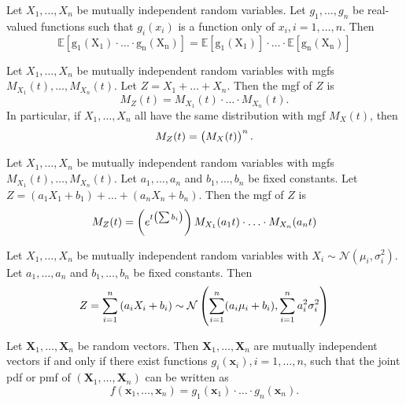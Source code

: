 \documentclass{article}
\theoremstyle{plain}
\newenvironment{theorem}[1]
      {\renewcommand\theinnertheorem{#1}\innertheorem}
      {\endinnertheorem}
\theoremstyle{definition}
\theoremstyle{plain}
\theoremstyle{plain}
\newenvironment{corollary}[1]
      {\renewcommand\theinnercorollary{#1}\innercorollary}
      {\endinnercorollary}
\renewcommand{\vec}[1]{\boldsymbol{#1}}
\newcommand{\E}[1]{\mathrm{\mathbb{E} \left[#1 \right]}}
\begin{document}
\begin{multicols}{2}
\begin{theorem}{4.6.6}[]
  Let $X_1, \ldots, X_n$ be mutually independent random variables.
  Let $g_1, \ldots, g_n$ be real-valued functions such that $g_i(x_i)$ is a function
  only of $x_i, i = 1, \ldots, n$.
  Then
  \begin{equation*}
    \E{g_1(X_1) \cdot \ldots \cdot g_n(X_n)}
    =
  \E{g_1(X_1)} \cdot \ldots \cdot \E{g_n(X_n)}
  \end{equation*}
\end{theorem}

\begin{theorem}{4.6.7}[]
  Let $X_1, \ldots, X_n$ be mutually independent random variables with mgfs
  $M_{X_1}(t), \ldots, M_{X_n}(t)$. Let $Z = X_1 + \ldots + X_n$.
  Then the mgf of $Z$ is
  \begin{equation*}
    M_Z(t) = M_{X_1}(t) \cdot \ldots \cdot M_{X_n}(t).
  \end{equation*}
  In particular, if $X_1, \ldots, X_n$ all have the same distribution with mgf
  $M_X(t)$, then
  \begin{equation*}
    M_Z(t) = \del{M_X(t)}^n.
  \end{equation*}
\end{theorem}

\begin{corollary}{4.6.9}[]
  Let $X_1, \ldots, X_n$ be mutually independent random variables with mgfs
  $M_{X_1}(t), \ldots, M_{X_n}(t)$. Let $a_1, \ldots, a_n$ and $b_1, \ldots, b_n$
  be fixed constants. Let $Z = (a_1 X_1 + b_1) + \ldots + (a_n X_n + b_n)$.
  Then the mgf of $Z$ is
  \begin{equation*}
    M_Z(t) = \del{e^{t\del{\sum b_i}}} M_{X_1}(a_1 t) \cdot \ldots \cdot M_{X_n}(a_n t)
  \end{equation*}
\end{corollary}

\begin{corollary}{4.6.10}[]
  Let $X_1, \ldots, X_n$ be mutually independent random variables with
  $X_i \sim \mathcal{N}(\mu_i, \sigma_i^{2})$. Let $a_1, \ldots, a_n$
  and $b_1, \ldots, b_n$ be fixed constants. Then
  \begin{equation*}
    Z = \sum_{i = 1}^{n} \del{a_i X_i + b_i}
    \sim
    \mathcal{N}\del{
      \sum_{i = 1}^{n} (a_i \mu_i + b_i), \sum_{i = 1}^{n} a_i^{2} \sigma_i^{2}
    }
  \end{equation*}
\end{corollary}

\begin{theorem}{4.6.11}[]
  Let $\vec{X}_1, \ldots, \vec{X}_n$ be random vectors.
  Then $\vec{X}_1, \ldots, \vec{X}_n$ are mutually independent vectors if and only if
  there exist functions $g_i(\vec{x}_i), i = 1, \ldots, n$, such that the joint pdf or pmf of
  $(\vec{X}_1, \ldots, \vec{X}_n)$ can be written as
  \begin{equation*}
    f(\vec{x}_1, \ldots, \vec{x}_n) = g_1(\vec{x}_1) \cdot \ldots \cdot g_n(\vec{x}_n).
  \end{equation*}
\end{theorem}


\end{multicols}
\end{document}
